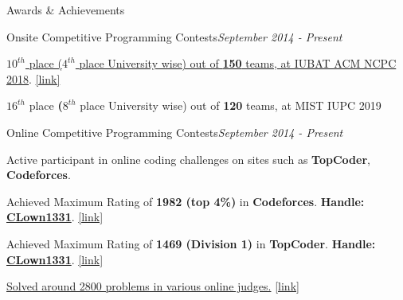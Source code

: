 \documentclass{resume}
\begin{document}
\begin{rSection}{Awards \& Achievements} 

\begin{rSubsection}{Onsite Competitive Programming Contests}{\em September 2014 - Present}{}{}{}
\item \href{https://icpc.baylor.edu/ICPCID/DII3NHEO8O8I}{\textbf{$10^{th}$} place (\textbf{$4^{th}$} place University wise) out of \textbf{150} teams, at IUBAT ACM NCPC 2018}. \href{https://icpc.baylor.edu/ICPCID/DII3NHEO8O8I}{[link]}
\item \textbf{$16^{th}$} place \textbf(\textbf{$8^{th}$} place University wise) out of \textbf{120} teams, at MIST IUPC 2019
\end{rSubsection}

\begin{rSubsection}{Online Competitive Programming Contests}{\em September 2014 - Present}{}{}{}
\item Active participant in online coding challenges on sites such as \textbf{TopCoder}, \textbf{Codeforces}.
\item Achieved Maximum Rating of \textbf{1982 (top 4\%)} in \textbf{Codeforces}. \textbf{Handle:} \textbf{\href{http://codeforces.com/profile/CLown1331}{CLown1331}}. \href{http://codeforces.com/profile/CLown1331}{[link]}
\item Achieved Maximum Rating of \textbf{1469 (Division 1)} in \textbf{TopCoder}. \textbf{Handle:} \textbf{\href{https://www.topcoder.com/members/CLown1331/}{CLown1331}}. \href{https://www.topcoder.com/members/CLown1331/}{[link]}
\item \href{https://www.stopstalk.com/user/profile/clown1331}{Solved around 2800 problems in various online judges.} \href{https://www.stopstalk.com/user/profile/clown1331}{[link]}
\end{rSubsection}

\end{rSection}

\end{document}
